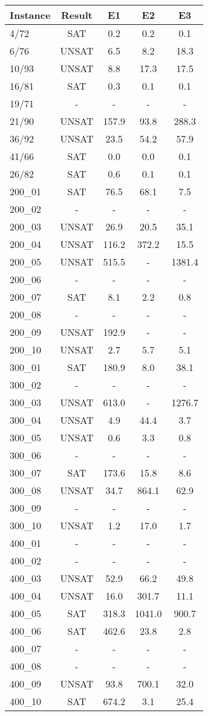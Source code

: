 \begin{tabular}{ lc|ccc }
Instance &Result &E1	    &E2	    &E3 \\
    \hline
4/72	&SAT	&0.2	&0.2	&0.1\\
6/76	&UNSAT	&6.5	&8.2	&18.3\\
10/93	&UNSAT	&8.8	&17.3	&17.5\\
16/81	&SAT	&0.3	&0.1	&0.1\\
19/71	&-	&-	&-	&-\\
21/90	&UNSAT	&157.9	&93.8	&288.3\\
36/92	&UNSAT	&23.5	&54.2	&57.9\\
41/66	&SAT	&0.0	&0.0	&0.1\\
26/82	&SAT	&0.6	&0.1	&0.1\\
200\_01	&SAT	&76.5	&68.1	&7.5\\
200\_02	&-	&-	&-	&-\\
200\_03	&UNSAT	&26.9	&20.5	&35.1\\
200\_04	&UNSAT	&116.2	&372.2	&15.5\\
200\_05	&UNSAT	&515.5	&-	&1381.4\\
200\_06	&-	&-	&-	&-\\
200\_07	&SAT	&8.1	&2.2	&0.8\\
200\_08	&-	&-	&-	&-\\
200\_09	&UNSAT	&192.9	&-	&-\\
200\_10	&UNSAT	&2.7	&5.7	&5.1\\
300\_01	&SAT	&180.9	&8.0	&38.1\\
300\_02	&-	&-	&-	&-\\
300\_03	&UNSAT	&613.0	&-	&1276.7\\
300\_04	&UNSAT	&4.9	&44.4	&3.7\\
300\_05	&UNSAT	&0.6	&3.3	&0.8\\
300\_06	&-	&-	&-	&-\\
300\_07	&SAT	&173.6	&15.8	&8.6\\
300\_08	&UNSAT	&34.7	&864.1	&62.9\\
300\_09	&-	&-	&-	&-\\
300\_10	&UNSAT	&1.2	&17.0	&1.7\\
400\_01	&-	&-	&-	&-\\
400\_02	&-	&-	&-	&-\\
400\_03	&UNSAT	&52.9	&66.2	&49.8\\
400\_04	&UNSAT	&16.0	&301.7	&11.1\\
400\_05	&SAT	&318.3	&1041.0	&900.7\\
400\_06	&SAT	&462.6	&23.8	&2.8\\
400\_07	&-	&-	&-	&-\\
400\_08	&-	&-	&-	&-\\
400\_09	&UNSAT	&93.8	&700.1	&32.0\\
400\_10	&SAT	&674.2	&3.1	&25.4\\
    \hline
\end{tabular}
